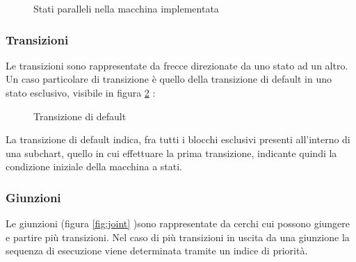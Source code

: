 \documentclass{article}
\begin{document}
                 
                \begin{figure} [ht]
                    \caption{Stati paralleli nella macchina implementata}
                    \label{fig:parallel}
                \end{figure}
            
            \subsubsection{Transizioni}
                
                Le transizioni sono rappresentate da frecce direzionate da uno stato ad un altro. \\
                Un caso particolare di transizione è quello della transizione di default in uno stato
                esclusivo, visibile in figura \ref{fig:default} :

                \begin{figure} [ht]
                    \caption{Transizione di default}
                    \label{fig:default}
                \end{figure}
                    
                La transizione di default indica, fra tutti i blocchi esclusivi presenti all'interno di una subchart, quello in cui effettuare la prima transizione, 
                indicante quindi la condizione iniziale della macchina a stati.\\

            \subsubsection{Giunzioni}
                Le giunzioni (figura \ref{fig:joint} )sono rappresentate da cerchi cui possono giungere e partire più transizioni. Nel caso di più transizioni in uscita da una giunzione
                la sequenza di esecuzione viene determinata tramite un indice di priorità.\\
\end{document}
